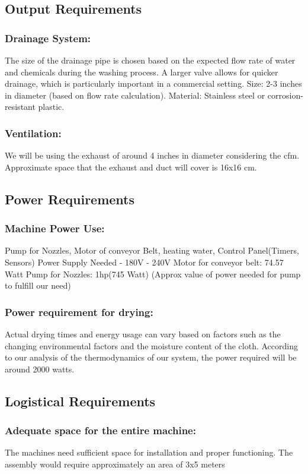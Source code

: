 \documentclass[12pt]{article} %
\begin{document}
\subsection{Output Requirements}
  \subsubsection{Drainage System:}The size of the drainage pipe is chosen based on the expected flow rate of water and chemicals during the washing process. A larger valve allows for quicker drainage, which is particularly important in a commercial setting. Size: 2-3 inches in diameter (based on flow rate calculation). Material: Stainless steel or corrosion-resistant plastic.
  \subsubsection{Ventilation:} We will be using the exhaust of around 4 inches in diameter considering the \acrshort{cfm}. Approximate space that the exhaust and duct will cover is  16x16 cm.

\subsection{Power Requirements}
  \subsubsection{Machine Power Use:} Pump for Nozzles, Motor of conveyor Belt, heating water, Control Panel(Timers, Sensors) 
Power Supply Needed - 180V - 240V
Motor for conveyor belt: 74.57 Watt
Pump for Nozzles: 1hp(745 Watt) (Approx value of power needed for pump to fulfill our need)

  
  \subsubsection{Power requirement for drying:} Actual drying times and energy usage can vary based on factors such as the changing environmental factors and the moisture content of the cloth. According to our analysis of the thermodynamics of our system, the power required will be around 2000 watts.

\subsection{Logistical Requirements}

  \subsubsection{Adequate space for the entire machine:}  The machines need sufficient space for installation and proper functioning. The assembly would require approximately an area of 3x5 meters
\end{document}

